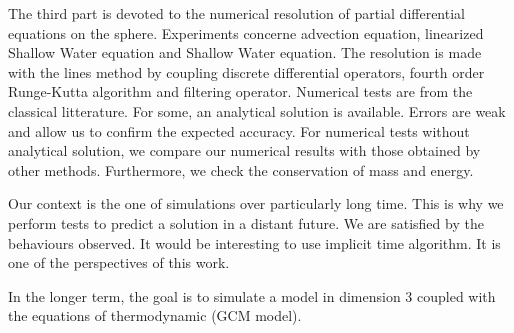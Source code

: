 \begin{EnglishAbstract}
The third part is devoted to the numerical resolution of partial differential equations on the sphere. Experiments concerne advection equation, linearized Shallow Water equation and Shallow Water equation. The resolution is made with the lines method by coupling discrete differential operators, fourth order Runge-Kutta algorithm and filtering operator. Numerical tests are from the classical litterature. For some, an analytical solution is available. Errors are weak and allow us to confirm the expected accuracy. For numerical tests without analytical solution, we compare our numerical results with those obtained by other methods. Furthermore, we check the conservation of mass and energy.

Our context is the one of simulations over particularly long time. This is why we perform tests to predict a solution in a distant future. We are satisfied by the behaviours observed. It would be interesting to use implicit time algorithm. It is one of the perspectives of this work.

In the longer term, the goal is to simulate a model in dimension 3 coupled with the equations of thermodynamic (GCM model).
  
  
  \end{EnglishAbstract}